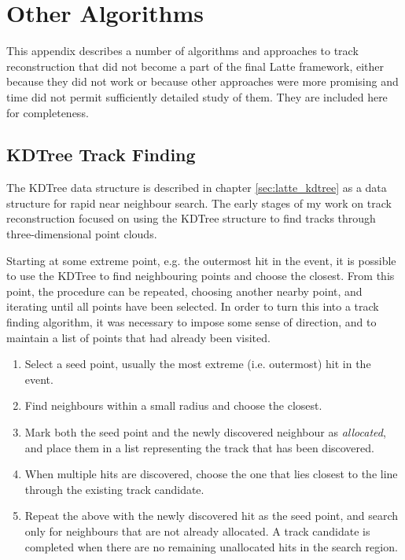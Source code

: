 \chapter{Other Algorithms}\label{appendix:other_alg}
This appendix describes a number of algorithms and approaches to track reconstruction that did not become a part of the final Latte framework, either because they did not work or because other approaches were more promising and time did not permit sufficiently detailed study of them. They are included here for completeness.

\section{KDTree Track Finding}
The KDTree data structure is described in chapter \ref{sec:latte_kdtree} as a data structure for rapid near neighbour search. The early stages of my work on track reconstruction focused on using the KDTree structure to find tracks through three-dimensional point clouds.

Starting at some extreme point, e.g. the outermost hit in the event, it is possible to use the KDTree to find neighbouring points and choose the closest. From this point, the procedure can be repeated, choosing another nearby point, and iterating until all points have been selected. In order to turn this into a track finding algorithm, it was necessary to impose some sense of direction, and to maintain a list of points that had already been visited.

\begin{enumerate}
    \item Select a seed point, usually the most extreme (i.e. outermost) hit in the event.
    \item Find neighbours within a small radius and choose the closest.
    \item Mark both the seed point and the newly discovered neighbour as \emph{allocated}, and place them in a list representing the track that has been discovered.
    \item When multiple hits are discovered, choose the one that lies closest to the line through the existing track candidate.
    \item Repeat the above with the newly discovered hit as the seed point, and search only for neighbours that are not already allocated. A track candidate is completed when there are no remaining unallocated hits in the search region.
\end{enumerate}

